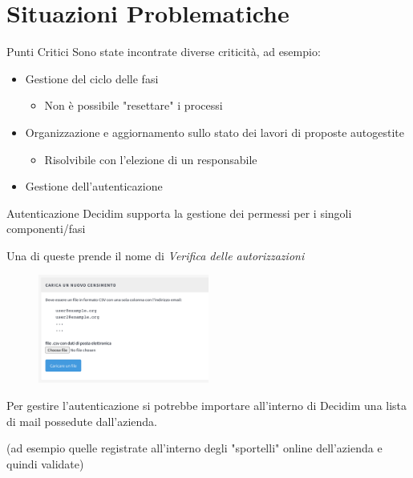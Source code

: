 \section{Situazioni Problematiche}

\begin{frame}{Punti Critici}
  Sono state incontrate diverse criticità, ad esempio:
  \begin{itemize}[<+- | alert@+>]
    \item{Gestione del ciclo delle fasi}
          \begin{itemize}
            \item Non è possibile "resettare" i processi
          \end{itemize}
    \item Organizzazione e aggiornamento sullo stato dei lavori di proposte autogestite
          \begin{itemize}
            \item Risolvibile con l'elezione di un responsabile
          \end{itemize}
    \item Gestione dell'autenticazione
  \end{itemize}

\end{frame}
\begin{frame}{Autenticazione}
  Decidim supporta la gestione dei permessi per i singoli componenti/fasi

  Una di queste prende il nome di \emph{Verifica delle autorizzazioni}

  \begin{figure}
    \centering
    \includegraphics[width=0.50\textwidth]{images/auth}
  \end{figure}

  Per gestire l'autenticazione si potrebbe importare all'interno di Decidim una lista di mail possedute dall'azienda.

  (ad esempio quelle registrate all'interno degli "sportelli" online dell'azienda e quindi validate)

\end{frame}